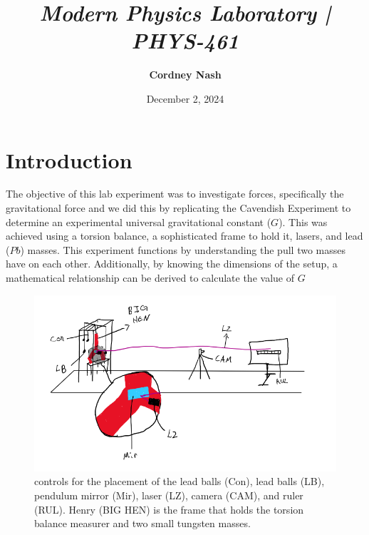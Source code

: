 \documentclass[a4paper,12pt,english]{all-in-one} %
\title{{\large\textit{Modern Physics Laboratory | PHYS-461}}\\[0.5cm]{\Huge\color{gray}\textsc{\@docsubtitle}}}
\author{\textbf{Cordney Nash}  }
\date{December 2, 2024}
\begin{document}
\begin{titlepage}
\maketitle\vfill
\end{titlepage}
\newpage 


\section*{Introduction}
{
The objective of this lab experiment was to investigate forces, specifically the gravitational force and we did this by replicating the Cavendish Experiment to determine an experimental universal gravitational constant ($G$). This was achieved using a torsion balance, a sophisticated frame to hold it, lasers, and lead ($Pb$) masses. This experiment functions by understanding the pull two masses have on each other. Additionally, by knowing the dimensions of the setup, a mathematical relationship can be derived to calculate the value of $G$
}

\begin{figure}[tbh]
    \centering
    \includegraphics[width=0.8\linewidth]{7-cavendish/overleaf/droc/images/cavendish_schem.PNG}
    \caption{ \scriptsize{ controls for the placement of the lead balls (Con), lead balls (LB), pendulum mirror (Mir), laser (LZ), camera (CAM), and ruler (RUL). Henry (BIG HEN) is the frame that holds the torsion balance measurer and two small tungsten masses.
    }}
    \label{fig:compton-diagram}
\end{figure}

\end{document}
